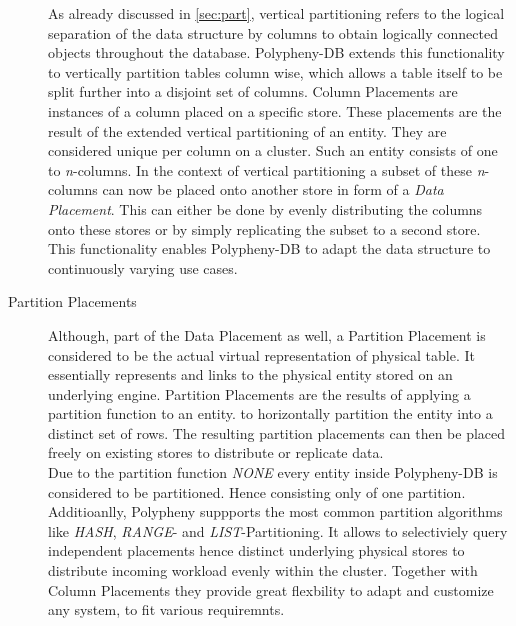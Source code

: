 \begin{description}
    As already discussed in \ref{sec:part}, vertical partitioning refers to the logical 
    separation of the data structure by columns to obtain logically connected objects throughout 
    the database. Polypheny-DB extends this functionality to vertically partition tables
    column wise, which allows a table itself to be split further into a disjoint 
    set of columns.
    Column Placements are instances of a column placed on a specific store.
    These placements are the result of the extended vertical partitioning of an entity.
    They are considered unique per column on a cluster.
    Such an entity consists of one to \textit{n}-columns.
    In the context of vertical partitioning a subset of these \textit{n}-columns can now 
    be placed onto another store in form of a \textit{Data Placement}.
    This can either be done by evenly distributing the columns onto these stores 
    or by simply replicating the subset to a second store.
    This functionality enables Polypheny-DB to adapt the data structure to continuously 
    varying use cases.\\

   

    \item [Partition Placements] Although, part of the Data Placement as well, a Partition Placement is considered to be the actual virtual representation of physical table.
    It essentially represents and links to the physical entity stored on an underlying engine. Partition Placements are the results of applying a partition function to an entity.
    to horizontally partition the entity into a distinct set of rows. The resulting partition placements can then be placed freely on existing stores to distribute or replicate data.\\
    Due to the partition function \emph{NONE} every entity inside Polypheny-DB is considered to be partitioned. Hence consisting only of one partition.
    Additioanlly, Polypheny suppports the most common partition algorithms like \emph{HASH}, \emph{RANGE}- and \emph{LIST}-Partitioning. 
    It allows to selectiviely query independent placements hence distinct underlying physical stores to distribute incoming workload evenly within the cluster.
    Together with Column Placements they provide great flexbility to adapt and customize any system, to fit various requiremnts.
    
\end{description}





